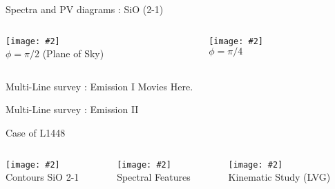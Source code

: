 \documentclass[8pt,xcolor=dvipsnames]{beamer}
\newcommand{\figpath}{./NEWFIGS/}
\newcommand{\spic}[2]{\texttt{[image: \#2]}}
\newcommand{\myref}[1]{{\small{\color{red}{(#1)}}}}
\begin{document}
\begin{frame}{Spectra and PV diagrams : SiO (2-1)}
\begin{columns}
\begin{column}{0.48\textwidth}
\spic{0.17}{\figpath/pfig8.pdf}\\
\hspace{0.2cm} $\phi = \pi/2$ (Plane of Sky)
\end{column}
\hfill
\begin{column}{0.48\textwidth}
\spic{0.17}{\figpath/pfig9.pdf}\\
\hspace{0.2cm}$\phi = \pi/4$ 
\end{column}
\end{columns}
\end{frame}

\begin{frame}{Multi-Line survey : Emission I}
Movies Here.
\end{frame}

\begin{frame}{Multi-Line survey : Emission II}
\end{frame}

\begin{frame}{Case of L1448 \myref{Nisini 2007}}
\begin{columns}[t]
\begin{column}{0.25\textwidth}
\spic{0.1}{\figpath/Nisini2007_f1.pdf}\\
Contours SiO 2-1
\end{column}

\begin{column}{0.40\textwidth}
 \spic{0.25}{\figpath/Nisini2007_f4.pdf}\\
 Spectral Features
\end{column}

\begin{column}{0.25\textwidth}
\spic{0.25}{\figpath/Nisini2007_f6.pdf} \\
Kinematic Study (LVG) 
\end{column}

\end{columns}
\end{frame}
\end{document}
